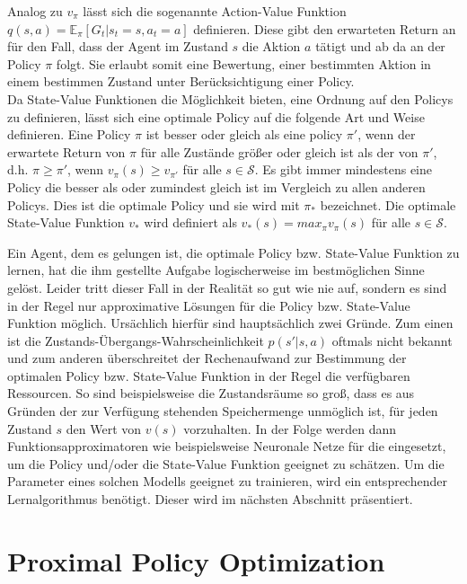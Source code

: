 Analog zu $v_\pi$ lässt sich die sogenannte Action-Value Funktion $q(s,a) = \mathbb{E}_\pi[G_t | s_t=s, a_t=a]$ definieren. Diese gibt den erwarteten Return an für den Fall, dass der Agent im Zustand $s$ die Aktion $a$ tätigt und ab da an der Policy $\pi$ folgt. Sie erlaubt somit eine Bewertung, einer bestimmten Aktion in einem bestimmen Zustand unter Berücksichtigung einer Policy.\\

Da State-Value Funktionen die Möglichkeit bieten, eine Ordnung auf den Policys zu definieren, lässt sich eine optimale Policy auf die folgende Art und Weise definieren. Eine Policy $\pi$ ist besser oder gleich als eine policy $\pi'$, wenn der erwartete Return von $\pi$ für alle Zustände größer oder gleich ist als der von $\pi'$, d.h. $\pi \ge \pi'$, wenn $v_\pi(s) \ge v_{\pi'}$ für alle $s \in \mathcal{S}$. Es gibt immer mindestens eine Policy die besser als oder zumindest gleich ist im Vergleich zu allen anderen Policys. Dies ist die optimale Policy und sie wird mit $\pi_*$ bezeichnet. Die optimale State-Value Funktion $v_*$ wird definiert als $v_*(s) = max_\pi v_\pi(s)$ für alle $s \in \mathcal{S}$.

Ein Agent, dem es gelungen ist, die optimale Policy bzw. State-Value Funktion zu lernen, hat die ihm gestellte Aufgabe logischerweise im bestmöglichen Sinne gelöst. Leider tritt dieser Fall in der Realität so gut wie nie auf, sondern es sind in der Regel nur approximative Lösungen für die Policy bzw. State-Value Funktion möglich. Ursächlich hierfür sind hauptsächlich zwei Gründe. Zum einen ist die Zustands-Übergangs-Wahrscheinlichkeit $p(s'|s,a)$ oftmals nicht bekannt und zum anderen überschreitet der Rechenaufwand zur Bestimmung der optimalen Policy bzw. State-Value Funktion in der Regel die verfügbaren Ressourcen. So sind beispielsweise die Zustandsräume so groß, dass es aus Gründen der zur Verfügung stehenden Speichermenge unmöglich ist, für jeden Zustand $s$ den Wert von $v(s)$ vorzuhalten. In der Folge werden dann Funktionsapproximatoren wie beispielsweise Neuronale Netze für die eingesetzt, um die Policy und/oder die State-Value Funktion geeignet zu schätzen. Um die Parameter eines solchen Modells geeignet zu trainieren, wird ein entsprechender Lernalgorithmus benötigt. Dieser wird im nächsten Abschnitt präsentiert.


\section{Proximal Policy Optimization}

